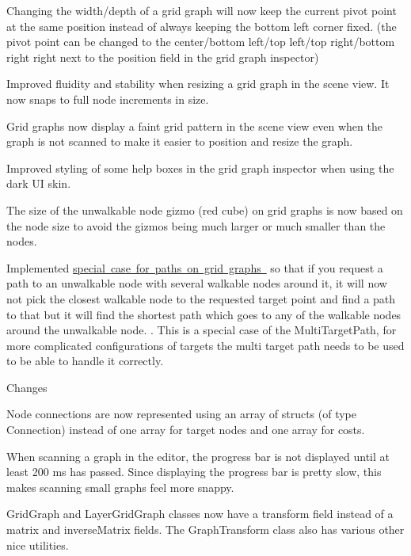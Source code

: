 \begin{DoxyItemize}
\begin{DoxyItemize}
\begin{DoxyItemize}
\begin{DoxyItemize}
\item Changing the width/depth of a grid graph will now keep the current pivot point at the same position instead of always keeping the bottom left corner fixed. (the pivot point can be changed to the center/bottom left/top left/top right/bottom right right next to the position field in the grid graph inspector)
\item Improved fluidity and stability when resizing a grid graph in the scene view. It now snaps to full node increments in size.
\item Grid graphs now display a faint grid pattern in the scene view even when the graph is not scanned to make it easier to position and resize the graph.
\item Improved styling of some help boxes in the grid graph inspector when using the dark UI skin.
\item The size of the unwalkable node gizmo (red cube) on grid graphs is now based on the node size to avoid the gizmos being much larger or much smaller than the nodes.
\item Implemented \mbox{\hyperlink{class_pathfinding_1_1_a_b_path_a489105925d89af5221815659605dac6e}{special case for paths on grid graphs }} so that if you request a path to an unwalkable node with several walkable nodes around it, it will now not pick the closest walkable node to the requested target point and find a path to that but it will find the shortest path which goes to any of the walkable nodes around the unwalkable node. . This is a special case of the Multi\+Target\+Path, for more complicated configurations of targets the multi target path needs to be used to be able to handle it correctly.
\end{DoxyItemize}
\end{DoxyItemize}
\item Changes
\begin{DoxyItemize}
\item Node connections are now represented using an array of structs (of type Connection) instead of one array for target nodes and one array for costs.
\item When scanning a graph in the editor, the progress bar is not displayed until at least 200 ms has passed. Since displaying the progress bar is pretty slow, this makes scanning small graphs feel more snappy.
\item Grid\+Graph and Layer\+Grid\+Graph classes now have a \textquotesingle{}transform\textquotesingle{} field instead of a matrix and inverse\+Matrix fields. The Graph\+Transform class also has various other nice utilities.

\end{DoxyItemize}
\end{DoxyItemize}
\end{DoxyItemize}
